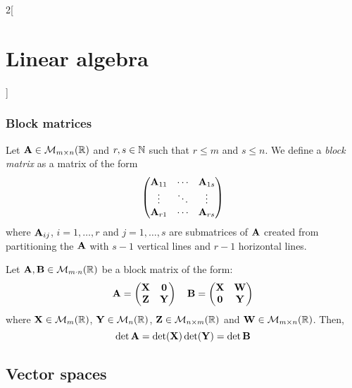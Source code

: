 \documentclass[../../../main.tex]{subfiles}
\begin{document}
\begin{multicols}{2}[\section{Linear algebra}]
  \subsubsection{Block matrices}
  \begin{definition}
    Let $\boldsymbol{\mathrm{A}}\in\mathcal{M}_{m\times n}(\mathbb{R})$ and $r,s\in\mathbb{N}$ such that $r\leq m$ and $s\leq n$. We define a \emph{block matrix} as a matrix of the form
    $$
      \begin{pmatrix}
        \boldsymbol{\mathrm{A}}_{11} & \cdots & \boldsymbol{\mathrm{A}}_{1s} \\
        \vdots      & \ddots & \vdots      \\
        \boldsymbol{\mathrm{A}}_{r1} & \cdots & \boldsymbol{\mathrm{A}}_{rs}
      \end{pmatrix}
    $$
    where $\boldsymbol{\mathrm{A}}_{ij}$, $i=1,\ldots,r$ and $j=1,\ldots,s$ are submatrices of $\boldsymbol{\mathrm{A}}$ created from partitioning the $\boldsymbol{\mathrm{A}}$ with $s-1$ vertical lines and $r-1$ horizontal lines.
  \end{definition}
  \begin{proposition}
    Let $\boldsymbol{\mathrm{A}},\boldsymbol{\mathrm{B}}\in\mathcal{M}_{m\cdot n}(\mathbb{R})$ be a block matrix of the form:
    $$\boldsymbol{\mathrm{A}}=
      \begin{pmatrix}
        \boldsymbol{\mathrm{X}} & \boldsymbol{\mathrm{0}} \\
        \boldsymbol{\mathrm{Z}} & \boldsymbol{\mathrm{Y}}
      \end{pmatrix}\quad
      \boldsymbol{\mathrm{B}}=
      \begin{pmatrix}
        \boldsymbol{\mathrm{X}} & \boldsymbol{\mathrm{W}} \\
        \boldsymbol{\mathrm{0}} & \boldsymbol{\mathrm{Y}}
      \end{pmatrix}
    $$
    where $\boldsymbol{\mathrm{X}}\in\mathcal{M}_m(\mathbb{R})$, $\boldsymbol{\mathrm{Y}}\in\mathcal{M}_n(\mathbb{R})$, $\boldsymbol{\mathrm{Z}}\in\mathcal{M}_{n\times m}(\mathbb{R})$ and $\boldsymbol{\mathrm{W}}\in\mathcal{M}_{m\times n}(\mathbb{R})$. Then, $$\det\boldsymbol{\mathrm{A}}=\det(\boldsymbol{\mathrm{X}})\det(\boldsymbol{\mathrm{Y}})=\det\boldsymbol{\mathrm{B}}$$
  \end{proposition}
  \subsection{Vector spaces}

\end{multicols}
\end{document}
